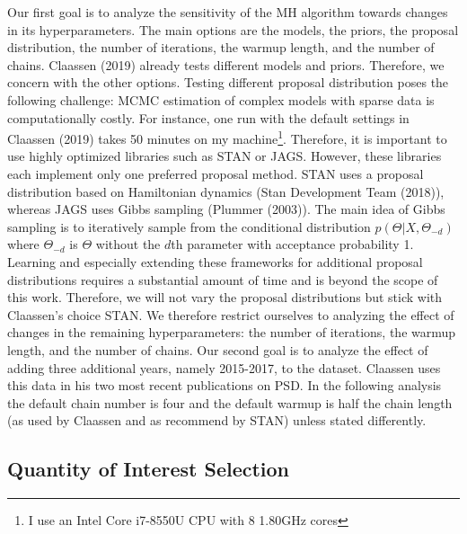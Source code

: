 \documentclass[12pt,english,a4paper,oneside]{article}
\theoremstyle{definition}
\theoremstyle{definition}
\theoremstyle{definition}
\theoremstyle{definition}
\theoremstyle{remark}
\begin{document}
Our first goal is to analyze the sensitivity of the MH algorithm towards changes in its hyperparameters. The main options are the models, the priors, the proposal distribution, the number of iterations, the warmup length, and the number of chains. Claassen (2019) already tests different models and priors. Therefore, we concern with the other options. Testing different proposal distribution poses the following challenge: MCMC estimation of complex models with sparse data is computationally costly. For instance, one run with the default settings in Claassen (2019) takes 50 minutes on my machine\footnote{I use an Intel Core i7-8550U CPU with 8 1.80GHz cores}. Therefore, it is important to use highly optimized libraries such as STAN or JAGS. However, these libraries each implement only one preferred proposal method. STAN uses a proposal distribution based on Hamiltonian dynamics (Stan Development Team (2018)), whereas JAGS uses Gibbs sampling (Plummer (2003)). The main idea of Gibbs sampling is to iteratively sample from the conditional distribution \(p(\Theta|X, \Theta_{-d})\) where \(\Theta_{-d}\) is \(\Theta\) without the \(d\)th parameter with acceptance probability 1. Learning and especially extending these frameworks for additional proposal distributions requires a substantial amount of time and is beyond the scope of this work. Therefore, we will not vary the proposal distributions but stick with Claassen's choice STAN. We therefore restrict ourselves to analyzing the effect of changes in the remaining hyperparameters: the number of iterations, the warmup length, and the number of chains. Our second goal is to analyze the effect of adding three additional years, namely 2015-2017, to the dataset. Claassen uses this data in his two most recent publications on PSD. In the following analysis the default chain number is four and the default warmup is half the chain length (as used by Claassen and as recommend by STAN) unless stated differently.

\hypertarget{quantity-of-interest-selection}{%
\subsection{Quantity of Interest Selection}\label{quantity-of-interest-selection}}
\end{document}
